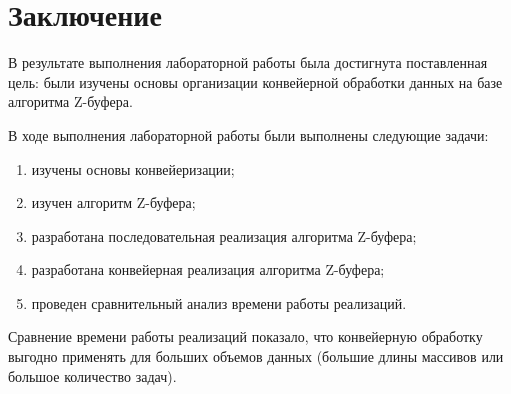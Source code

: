 \chapter*{Заключение}

В результате выполнения лабораторной работы была достигнута поставленная цель: были изучены основы организации конвейерной обработки данных на базе алгоритма Z-буфера.

В ходе выполнения лабораторной работы были выполнены следующие задачи: 
\begin{enumerate}[label={\arabic*)}]
	\item изучены основы конвейеризации;
	\item изучен алгоритм Z-буфера;
	\item разработана последовательная реализация алгоритма Z-буфера;
	\item разработана конвейерная реализация алгоритма Z-буфера;
        \item проведен сравнительный анализ времени работы реализаций.
\end{enumerate}

Сравнение времени работы реализаций показало, что конвейерную обработку выгодно применять для больших объемов данных (большие длины массивов или большое количество задач).